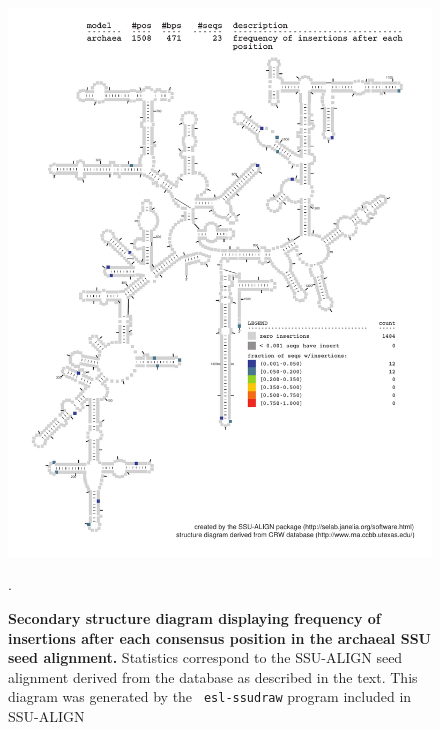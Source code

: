 \begin{figure}
\begin{center}
\includegraphics[width=5.7in]{Figures/archaea-0p1-ifreq}
\end{center}
\caption[Secondary structure diagram displaying frequency of insertions
  after each consensus position in the archaeal SSU seed
  alignment]{\textbf{Secondary structure diagram displaying frequency
  of insertions after each consensus position in the archaeal SSU seed
  alignment.} Statistics correspond to the SSU-ALIGN seed
  alignment derived from the  database \cite{CannoneGutell02}
  as described in the text. This diagram was generated by the {\tt
  esl-ssudraw} program included in SSU-ALIGN}.
\label{fig:arcins}
\end{figure}


